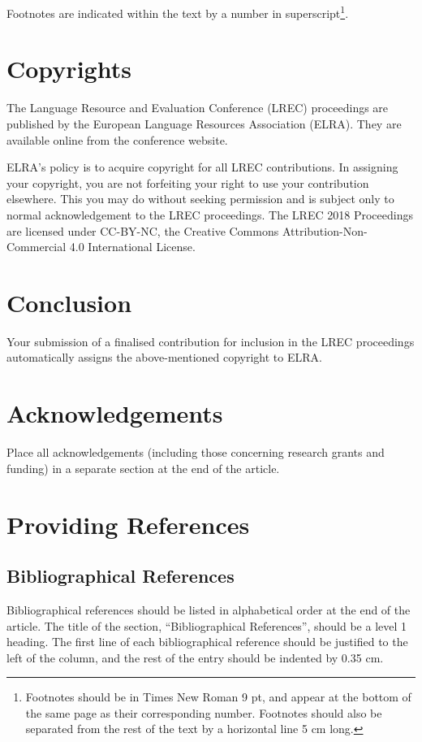 \documentclass{lrec}
\begin{document}
Footnotes are indicated within the text by a number in
superscript\footnote{Footnotes should be in Times New Roman 9 pt, and appear at
the bottom of the same page as their corresponding number. Footnotes should also
be separated from the rest of the text by a horizontal line 5 cm long.}.

\section{Copyrights}

The Lan\-gua\-ge Re\-sour\-ce and Evalua\-tion Con\-fe\-rence (LREC)
proceedings are published by the European Language Resources Association (ELRA).
They are available online from the conference website.


ELRA's policy is to acquire copyright for all LREC contributions. In assigning
your copyright, you are not forfeiting your right to use your contribution
elsewhere. This you may do without seeking permission and is subject only to
normal acknowledgement to the LREC proceedings. The LREC 2018 Proceedings are
licensed under CC-BY-NC, the Creative Commons Attribution-Non-Commercial 4.0
International License.

\section{Conclusion}

Your submission of a finalised contribution for inclusion in the LREC
proceedings automatically assigns the above-mentioned copyright to ELRA.


\section{Acknowledgements}

Place all acknowledgements (including those concerning research grants and
funding) in a separate section at the end of the article.

\section{Providing References}

\subsection{Bibliographical References}
Bibliographical references should be listed in alphabetical order at the
end of the article. The title of the section, ``Bibliographical References'',
should be a level 1 heading. The first line of each bibliographical reference
should be justified to the left of the column, and the rest of the entry should
be indented by 0.35 cm.
\end{document}
